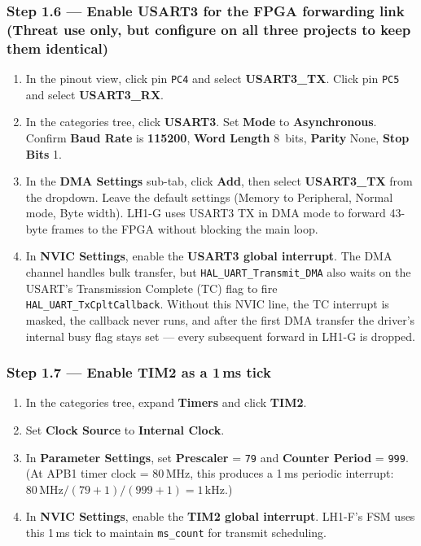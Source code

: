\documentclass[11pt,letterpaper]{article}
\begin{document}
\subsubsection*{Step 1.6 --- Enable USART3 for the FPGA forwarding link (Threat use only, but configure on all three projects to keep them identical)}

\begin{enumerate}[leftmargin=2em]
	\item In the pinout view, click pin \texttt{PC4} and select \textbf{USART3\_TX}. Click pin \texttt{PC5} and select \textbf{USART3\_RX}.
	\item In the categories tree, click \textbf{USART3}. Set \textbf{Mode} to \textbf{Asynchronous}. Confirm \textbf{Baud Rate} is \textbf{115200}, \textbf{Word Length} 8~bits, \textbf{Parity} None, \textbf{Stop Bits} 1.
	\item In the \textbf{DMA Settings} sub-tab, click \textbf{Add}, then select \textbf{USART3\_TX} from the dropdown. Leave the default settings (Memory to Peripheral, Normal mode, Byte width). LH1-G uses USART3 TX in DMA mode to forward 43-byte frames to the FPGA without blocking the main loop.
	\item In \textbf{NVIC Settings}, enable the \textbf{USART3 global interrupt}. The DMA channel handles bulk transfer, but \texttt{HAL\_UART\_Transmit\_DMA} also waits on the USART's Transmission Complete (TC) flag to fire \texttt{HAL\_UART\_TxCpltCallback}. Without this NVIC line, the TC interrupt is masked, the callback never runs, and after the first DMA transfer the driver's internal busy flag stays set --- every subsequent forward in LH1-G is dropped.
\end{enumerate}

\subsubsection*{Step 1.7 --- Enable TIM2 as a 1\,ms tick}

\begin{enumerate}[leftmargin=2em]
	\item In the categories tree, expand \textbf{Timers} and click \textbf{TIM2}.
	\item Set \textbf{Clock Source} to \textbf{Internal Clock}.
	\item In \textbf{Parameter Settings}, set \textbf{Prescaler} = \texttt{79} and \textbf{Counter Period} = \texttt{999}. (At APB1 timer clock = 80\,MHz, this produces a 1\,ms periodic interrupt: $80\,\mathrm{MHz} / (79+1) / (999+1) = 1\,\mathrm{kHz}$.)
	\item In \textbf{NVIC Settings}, enable the \textbf{TIM2 global interrupt}. LH1-F's FSM uses this 1\,ms tick to maintain \texttt{ms\_count} for transmit scheduling.
\end{enumerate}
\end{document}
